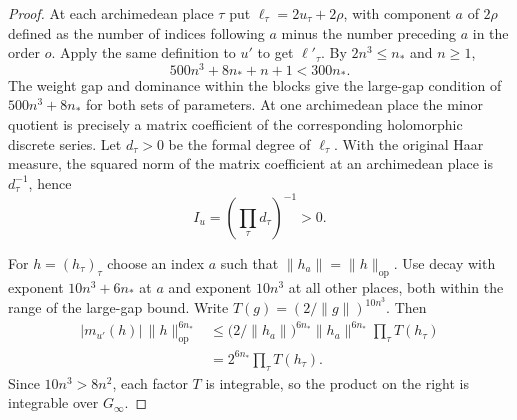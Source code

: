 \begin{proof}
At each archimedean place $\tau$ put $\ell_\tau=2u_\tau+2\rho$, with component $a$ of $2\rho$ defined as the number of indices following $a$ minus the number preceding $a$ in the order $o$. Apply the same definition to $u'$ to get $\ell'_\tau$. By $2n^3\le n_*$ and $n\ge1$,
\[
 500n^3+8n_*+n+1<300n_*.
\]
The weight gap and dominance within the blocks give the large-gap condition of $500n^3+8n_*$ for both sets of parameters. At one archimedean place the minor quotient is precisely a matrix coefficient of the corresponding holomorphic discrete series. Let $d_\tau>0$ be the formal degree of $\ell_\tau$. With the original Haar measure, the squared norm of the matrix coefficient at an archimedean place is $d_\tau^{-1}$, hence
\[
   I_u=\left(\prod_\tau d_\tau\right)^{-1}>0 .
\]

For $h=(h_\tau)_\tau$ choose an index $a$ such that $\|h_a\|=\|h\|_{\mathrm{op}}$. Use decay with exponent $10n^3+6n_*$ at $a$ and exponent $10n^3$ at all other places, both within the range of the large-gap bound. Write $T(g)=(2/\|g\|)^{10n^3}$. Then
\[
 \begin{aligned}
 |m_{u'}(h)|\,\|h\|_{\mathrm{op}}^{6n_*}
 &\le \bigl(2/\|h_a\|\bigr)^{6n_*}
               \|h_a\|^{6n_*}\prod_\tau T(h_\tau)\\
 &=2^{6n_*}\prod_\tau T(h_\tau).
 \end{aligned}
\]
Since $10n^3>8n^2$, each factor $T$ is integrable, so the product on the right is integrable over $G_\infty$.


\end{proof}

